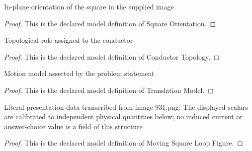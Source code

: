 \begin{definition}
  \label{def:physics:phyx-mini-0931:phyxminiproblems-problemphyxmini0931-squareorientation}
  In-plane orientation of the square in the supplied image
\end{definition}
\begin{proof}
  This is the declared model definition of Square Orientation.
\end{proof}
\begin{definition}
  \label{def:physics:phyx-mini-0931:phyxminiproblems-problemphyxmini0931-conductortopology}
  Topological role assigned to the conductor
\end{definition}
\begin{proof}
  This is the declared model definition of Conductor Topology.
\end{proof}
\begin{definition}
  \label{def:physics:phyx-mini-0931:phyxminiproblems-problemphyxmini0931-translationmodel}
  Motion model asserted by the problem statement
\end{definition}
\begin{proof}
  This is the declared model definition of Translation Model.
\end{proof}
\begin{definition}
  \label{def:physics:phyx-mini-0931:phyxminiproblems-problemphyxmini0931-movingsquareloopfigure}
  Literal presentation data transcribed from image 931.png. The displayed scalars are calibrated to independent physical quantities below; no induced current or answer-choice value is a field of this structure
\end{definition}
\begin{proof}
  This is the declared model definition of Moving Square Loop Figure.
\end{proof}
